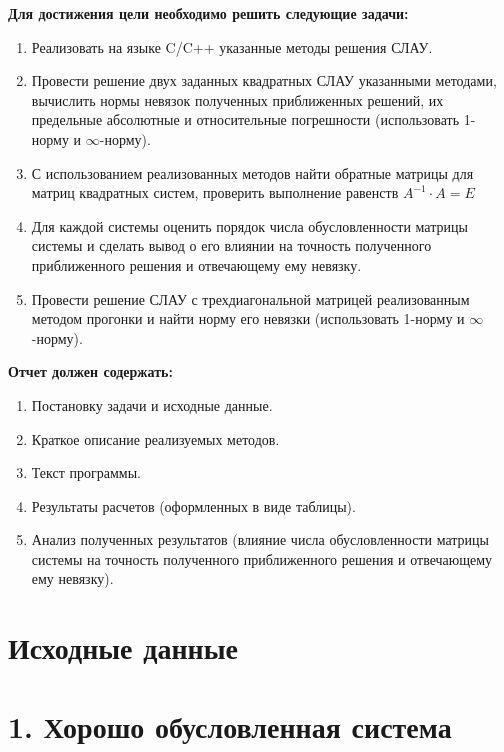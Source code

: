 \documentclass[12pt, a4paper]{article}
\begin{document}
	\vspace{5mm}
	\textbf{Для достижения цели необходимо решить следующие задачи:}
	\vspace{5mm}
	\begin{enumerate}
		\item Реализовать на языке C/C++ указанные методы решения СЛАУ.
		\item Провести решение двух заданных квадратных СЛАУ указанными методами, вычислить нормы невязок полученных приближенных решений, их предельные абсолютные и относительные погрешности (использовать 1-норму и $\infty$-норму).
		\item С использованием реализованных методов найти обратные матрицы для матриц квадратных систем, проверить выполнение равенств $ A^{-1}\cdot A=E$
		\item Для каждой системы оценить порядок числа обусловленности матрицы системы и сделать вывод о его влиянии на точность полученного приближенного решения и отвечающему ему невязку. 
		\item Провести решение СЛАУ с трехдиагональной матрицей реализованным методом прогонки и найти норму его невязки (использовать 1-норму и $\infty$-норму).

	\end{enumerate}

\vspace{5mm}
	\textbf{Отчет должен содержать:}
	\vspace{5mm}
	\begin{enumerate}
		\item  Постановку задачи и исходные данные.
		\item Краткое описание реализуемых методов. 
		\item Текст программы.
		\item  Результаты расчетов (оформленных в виде таблицы).
 		\item  Анализ полученных результатов (влияние числа обусловленности матрицы системы на точность полученного приближенного решения и отвечающему ему невязку).
	\end{enumerate}
    	\newpage
        \center
		\section*{Исходные данные} 

\section*{1. Хорошо обусловленная система}
\end{document}
